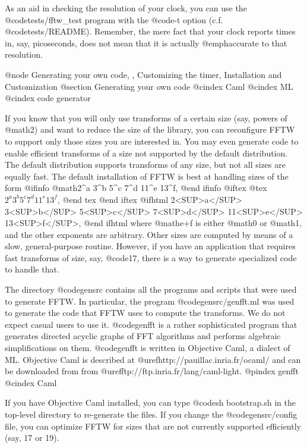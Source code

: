 As an aid in checking the resolution of your clock, you can use the
@code{tests/fftw_test} program with the @code{-t} option
(c.f. @code{tests/README}). Remember, the mere fact that your clock
reports times in, say, picoseconds, does not mean that it is actually
@emph{accurate} to that resolution.

@node Generating your own code,  , Customizing the timer, Installation and Customization
@section Generating your own code
@cindex Caml
@cindex ML
@cindex code generator

If you know that you will only use transforms of a certain size (say,
powers of @math{2}) and want to reduce the size of the library, you can
reconfigure FFTW to support only those sizes you are interested in.  You
may even generate code to enable efficient transforms of a size not
supported by the default distribution.  The default distribution
supports transforms of any size, but not all sizes are equally fast.
The default installation of FFTW is best at handling sizes of the form
@ifinfo
@math{2^a 3^b 5^c 7^d 11^e 13^f},
@end ifinfo
@iftex
@tex
$2^a 3^b 5^c 7^d 11^e 13^f$,
@end tex
@end iftex
@ifhtml
2<SUP>a</SUP> 3<SUP>b</SUP> 5<SUP>c</SUP> 7<SUP>d</SUP>
        11<SUP>e</SUP> 13<SUP>f</SUP>,
@end ifhtml
where @math{e+f} is either @math{0} or
@math{1}, and the other exponents are arbitrary.  Other sizes are
computed by means of a slow, general-purpose routine.  However, if you
have an application that requires fast transforms of size, say,
@code{17}, there is a way to generate specialized code to handle that.

The directory @code{gensrc} contains all the programs and scripts that
were used to generate FFTW.  In particular, the program
@code{gensrc/genfft.ml} was used to generate the code that FFTW uses to
compute the transforms.  We do not expect casual users to use it.
@code{genfft} is a rather sophisticated program that generates directed
acyclic graphs of FFT algorithms and performs algebraic simplifications
on them.  @code{genfft} is written in Objective Caml, a dialect of ML.
Objective Caml is described at @uref{http://pauillac.inria.fr/ocaml/}
and can be downloaded from from @uref{ftp://ftp.inria.fr/lang/caml-light}.
@pindex genfft
@cindex Caml

If you have Objective Caml installed, you can type @code{sh
bootstrap.sh} in the top-level directory to re-generate the files.  If
you change the @code{gensrc/config} file, you can optimize FFTW for
sizes that are not currently supported efficiently (say, 17 or 19).

